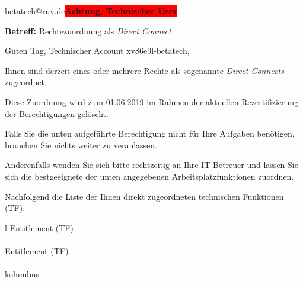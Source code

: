 \documentclass[a4paper,landscape,12pt]{letter}
\begin{document}
\begin{letter}{betatech@ruv.de\space\space\space\space\space\space\space\space\space\bfseries\colorbox{red}{Achtung, Technischer User}\hfill \break}
\begin{normalsize}
	\opening{\textbf{Betreff:} Rechtezuordnung als \emph{Direct Connect}}
	\begin{normalsize} \hfill
	\end{normalsize}

	\begin{normalsize}
		Guten Tag, 
	Technischer Account xv86e9l-betatech, \hfill \break
	\end{normalsize}
	\end{normalsize}
	
\begin{normalsize}
	Ihnen sind derzeit eines oder mehrere Rechte als sogenannte \emph{Direct Connects} zugeordnet.
	
	Diese Zuordnung wird zum 01.06.2019 im Rahmen der aktuellen Rezertifizierung der Berechtigungen gelöscht.
	
	Falls Sie die unten aufgeführte Berechtigung nicht für Ihre Aufgaben benötigen, 
	brauchen Sie nichts weiter zu veranlassen.
	
	Anderenfalls wenden Sie sich bitte rechtzeitig an Ihre IT-Betreuer 
	und lassen Sie sich die bestgeeignete der unten angegebenen Arbeitsplatzfunktionen zuordnen.
	\end{normalsize}
	
\begin{normalsize}
	Nachfolgend die Liste der Ihnen direkt zugeordneten technischen Funktionen (TF):

	\begin{longtable}{l}
		Entitlement (TF) \\ \hline
		\endfirsthead
		\\\hline
		Entitlement (TF) \\ \hline
		\endhead %
		\multicolumn{1}{r@{}}{Fortsetzung \ldots}\\
		\endfoot
		\hline
		\endlastfoot
	kolumbus\\
	\end{longtable}
	\end{normalsize}
	

\end{letter}
\end{document}
